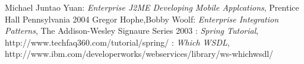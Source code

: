 \begin{thebibliography}{99}
 Michael Juntao Yuan: \emph{Enterprise J2ME Developing Mobile
Applcations}, Prentice Hall Pennsylvania 2004
 Gregor Hophe,Bobby Woolf: \emph{Enterprise Integration
Patterns}, The Addison-Wesley Signaure Series 2003
: \emph{Spring Tutorial},
http://www.techfaq360.com/tutorial/spring/
: \emph{Which WSDL},
http://www.ibm.com/developerworks/webservices/library/ws-whichwsdl/
\end{thebibliography}